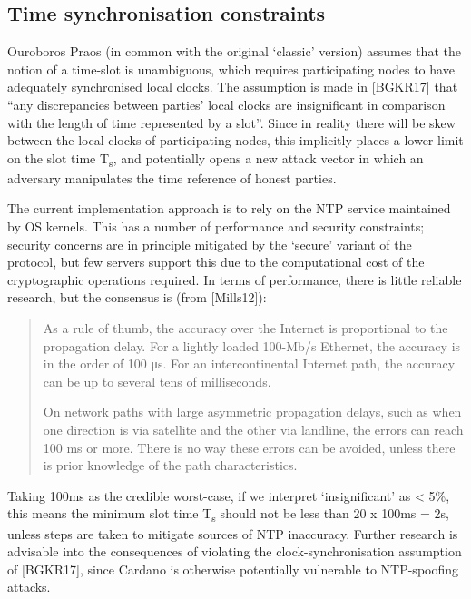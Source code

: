 \documentclass[11pt,a4paper]{article}
\begin{document}
\subsection{Time synchronisation constraints}
\label{time-synchronisation-constraints}

Ouroboros Praos (in common with the original `classic' version) assumes
that the notion of a time-slot is unambiguous, which requires
participating nodes to have adequately synchronised local clocks. The
assumption is made in {[}BGKR17{]} that ``any discrepancies between
parties' local clocks are insignificant in comparison with the length of
time represented by a slot''. Since in reality there will be skew
between the local clocks of participating nodes, this implicitly places
a lower limit on the slot time T\textsubscript{s}, and potentially opens
a new attack vector in which an adversary manipulates the time reference
of honest parties.

The current implementation approach is to rely on the NTP service
maintained by OS kernels. This has a number of performance and security
constraints; security concerns are in principle mitigated by the
`secure' variant of the protocol, but few servers support this due to
the computational cost of the cryptographic operations required. In
terms of performance, there is little reliable research, but the
consensus is (from {[}Mills12{]}):

\begin{quote}
As a rule of thumb, the accuracy over the Internet is proportional to
the propagation delay. For a lightly loaded 100-Mb/s Ethernet, the
accuracy is in the order of 100 μs. For an intercontinental Internet
path, the accuracy can be up to several tens of milliseconds.

On network paths with large asymmetric propagation delays, such as when
one direction is via satellite and the other via landline, the errors
can reach 100 ms or more. There is no way these errors can be avoided,
unless there is prior knowledge of the path characteristics.
\end{quote}

Taking 100ms as the credible worst-case, if we interpret `insignificant'
as \textless{} 5\%, this means the minimum slot time T\textsubscript{s}
should not be less than 20 x 100ms = 2s, unless steps are taken to
mitigate sources of NTP inaccuracy. Further research is advisable into
the consequences of violating the clock-synchronisation assumption of
{[}BGKR17{]}, since Cardano is otherwise potentially vulnerable to
NTP-spoofing attacks.
\end{document}
